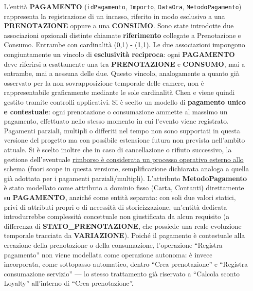 \documentclass[a4paper,12pt]{report}
\begin{document}
L'entità \textbf{PAGAMENTO} (\texttt{idPagamento}, \texttt{Importo},
\texttt{DataOra}, \texttt{MetodoPagamento}) rappresenta la registrazione
di un incasso, riferito in modo esclusivo a una \textbf{PRENOTAZIONE}
oppure a una \textbf{CONSUMO}. Sono state introdotte due associazioni
opzionali distinte chiamate \textbf{riferimento} collegate a Prenotazione e Consumo. Entrambe con cardinalità (0,1) - (1,1).
\medskip
\newline
Le due associazioni impongono congiuntamente un vincolo di
\textbf{esclusività reciproca}: ogni \textbf{PAGAMENTO} deve riferirsi a
esattamente una tra \textbf{PRENOTAZIONE} e \textbf{CONSUMO}, mai a
entrambe, mai a nessuna delle due. Questo vincolo, analogamente a quanto
già osservato per la non sovrapposizione temporale delle camere, non è
rappresentabile graficamente mediante le sole cardinalità Chen e viene
quindi gestito tramite controlli applicativi.
\medskip
\newline
Si è scelto un modello di \textbf{pagamento unico e contestuale}: ogni
prenotazione o consumazione ammette al massimo un pagamento, effettuato nello
stesso momento in cui l'evento viene registrato. Pagamenti parziali,
multipli o differiti nel tempo non sono supportati in questa versione del
progetto ma con possibile estensione
futura non prevista nell'ambito attuale.
\newline
Si è scelto inoltre che in caso di cancellazione o rifiuto successivo, la gestione dell'eventuale
\underline{rimborso è considerata un processo operativo esterno allo schema} (fuori
scope in questa versione, semplificazione dichiarata analoga a quella già
adottata per i pagamenti parziali/multipli).
\medskip
\newline
L'attributo \textbf{MetodoPagamento} è stato modellato come attributo a
dominio fisso (Carta, Contanti) direttamente su \textbf{PAGAMENTO},
anziché come entità separata: con soli due valori statici, privi di
attributi propri o di necessità di storicizzazione, un'entità dedicata
introdurrebbe complessità concettuale non giustificata da alcun
requisito (a differenza di \textbf{STATO\_PRENOTAZIONE}, che possiede una
reale evoluzione temporale tracciata da \textbf{VARIAZIONE}).
\medskip
\newline
Poiché il pagamento è contestuale alla creazione della prenotazione o
della consumazione, l'operazione ``Registra pagamento'' non viene
modellata come operazione autonoma: è invece incorporata, come
sottopasso automatico, dentro ``Crea prenotazione'' e ``Registra
consumazione servizio'' --- lo stesso trattamento già riservato a
``Calcola sconto Loyalty'' all'interno di ``Crea prenotazione''.
\end{document}
